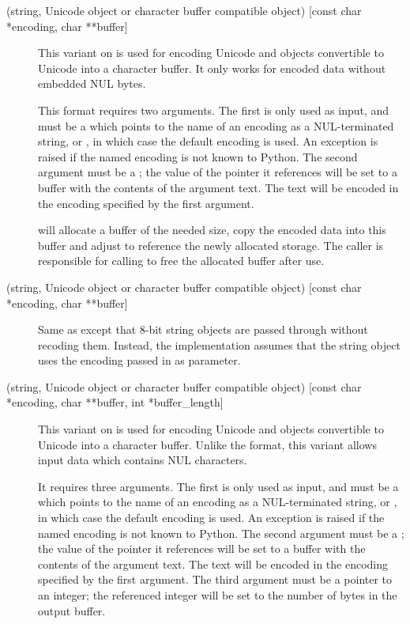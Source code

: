\begin{description}
  \item[ (string, Unicode object or character buffer
  compatible object) {[const char *encoding, char **buffer]}]
  This variant on  is used for encoding Unicode and objects
  convertible to Unicode into a character buffer. It only works for
  encoded data without embedded NUL bytes.

  This format requires two arguments.  The first is only used as
  input, and must be a  which points to the name of an
  encoding as a NUL-terminated string, or \NULL, in which case the
  default encoding is used.  An exception is raised if the named
  encoding is not known to Python.  The second argument must be a
  ; the value of the pointer it references will be set
  to a buffer with the contents of the argument text.  The text will
  be encoded in the encoding specified by the first argument.

   will allocate a buffer of the needed
  size, copy the encoded data into this buffer and adjust
   to reference the newly allocated storage.  The caller
  is responsible for calling  to free the
  allocated buffer after use.

  \item[ (string, Unicode object or character buffer
  compatible object) {[const char *encoding, char **buffer]}]
  Same as  except that 8-bit string objects are passed
  through without recoding them.  Instead, the implementation assumes
  that the string object uses the encoding passed in as parameter.

  \item[ (string, Unicode object or character buffer compatible
  object) {[const char *encoding, char **buffer, int *buffer_length]}]
  This variant on  is used for encoding Unicode and objects
  convertible to Unicode into a character buffer.  Unlike the
   format, this variant allows input data which contains NUL
  characters.

  It requires three arguments.  The first is only used as input, and
  must be a  which points to the name of an encoding as a
  NUL-terminated string, or \NULL, in which case the default encoding
  is used.  An exception is raised if the named encoding is not known
  to Python.  The second argument must be a ; the value
  of the pointer it references will be set to a buffer with the
  contents of the argument text.  The text will be encoded in the
  encoding specified by the first argument.  The third argument must
  be a pointer to an integer; the referenced integer will be set to
  the number of bytes in the output buffer.


\end{description}
